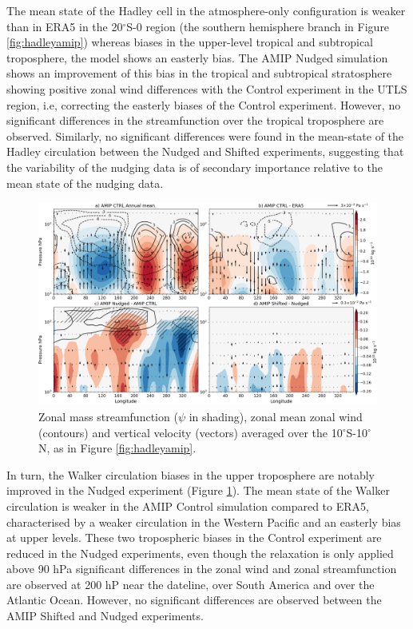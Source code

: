 The mean state of the Hadley cell in the atmosphere-only configuration is weaker than in ERA5 in the 20$^\circ$S-0 region (the southern hemisphere branch in Figure \ref{fig:hadleyamip}) whereas biases in the upper-level tropical and subtropical troposphere, the model shows an easterly bias. 
The AMIP Nudged simulation shows an improvement of this bias in the tropical and subtropical stratosphere showing positive zonal wind differences with the Control experiment in the UTLS region, i.e, correcting the easterly biases of the Control experiment. However, no significant differences in the streamfunction over the tropical troposphere are observed. Similarly, no significant differences were found in the mean-state of the Hadley circulation between the Nudged and Shifted experiments, suggesting that the variability of the nudging data is of secondary importance relative to the mean state of the nudging data. 

\begin{figure}[t!]
\centering
 \includegraphics[width=\linewidth]{figures/suite_streamwalkerclim.png}
\caption[Walker in atmosphere-only experiments]{Zonal mass streamfunction ($\psi$ in shading), zonal mean zonal wind (contours) and vertical velocity (vectors) averaged over the 10$^\circ$S-10$^\circ$N, as in Figure \ref{fig:hadleyamip}. }
\label{fig:walkeramip}
\end{figure}

In turn, the Walker circulation biases in the upper troposphere are notably improved in the Nudged experiment (Figure \ref{fig:walkeramip}). The mean state of the Walker circulation is weaker in the AMIP Control simulation compared to ERA5, characterised by a weaker circulation in the Western Pacific and an easterly bias at upper levels. These two tropospheric biases in the Control experiment are reduced in the Nudged experiments, even though the relaxation is only applied above 90 hPa significant differences in the zonal wind and zonal streamfunction are observed at 200 hP near the dateline, over South America and over the Atlantic Ocean. 
However, no significant differences are observed between the AMIP Shifted and Nudged experiments. 

